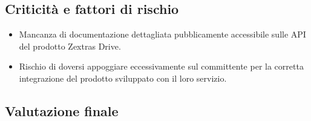 \subsection{Criticità e fattori di rischio}
\begin{itemize}
\item Mancanza di documentazione dettagliata pubblicamente accessibile sulle API del prodotto Zextras Drive.
\item Rischio di doversi appoggiare eccessivamente sul committente per la corretta integrazione del prodotto sviluppato con il loro servizio.
\end{itemize}

\subsection{Valutazione finale}